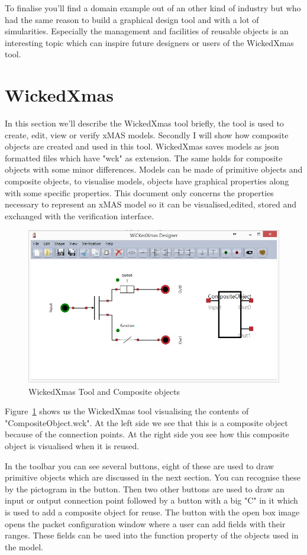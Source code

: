 \documentclass[a4paper,11pt,final]{article}
\begin{document}
To finalise you'll find a domain example out of an other kind of industry but
who had the same reason to build a graphical design tool and with a lot of
simularities.
Especially the management and facilities of reusable objects is an 
interesting topic which can inspire future designers or users of the
WickedXmas tool.

\newpage
\section{WickedXmas}
In this section we'll describe the WickedXmas tool briefly, the tool is used
to create, edit, view or verify xMAS models. Secondly I will show how
composite objects are created and used in this tool.
WickedXmas saves models as json formatted files which have "wck" as
extension. The same holds for composite objects with some minor
differences. Models can be made of primitive objects and composite objects,
to visualise models, objects have graphical properties along with some
specific properties. 
This document only concerns the properties necessary to represent an
xMAS model so it can be visualised,edited, stored and exchanged with
the verification interface.

\begin{figure}[here]
\includegraphics[width=1.0\textwidth]{wxmCO}
\caption{WickedXmas Tool and Composite objects}
\label{fig:wxmCO}
\end{figure}
Figure~\ref{fig:wxmCO} shows us the WickedXmas tool visualising the contents
of "CompositeObject.wck". At the left side we see that this is a composite
object because of the connection points. At the right side you see how this 
composite object is visualised when it is reused.

In the toolbar you can see several buttons, eight of these are used to draw
primitive objects which are discussed in the next section. You can recognise
these by the pictogram in the button. Then two other buttons are used to
draw an input or output connection point followed by a button with a big "C"
in it which is used to add a composite object for reuse.
The button with the open box image opens the packet configuration
window where a user can add fields with their ranges. These fields can be
used into the function property of the objects used in the model.
\end{document}
